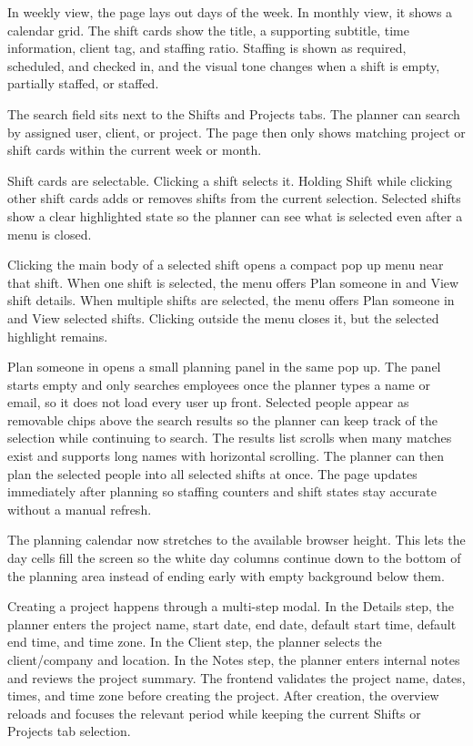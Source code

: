\documentclass[11pt]{article}
\begin{document}
In weekly view, the page lays out days of the week. In monthly view, it shows a calendar grid. The shift cards show the title, a supporting subtitle, time information, client tag, and staffing ratio. Staffing is shown as required, scheduled, and checked in, and the visual tone changes when a shift is empty, partially staffed, or staffed.

The search field sits next to the Shifts and Projects tabs. The planner can search by assigned user, client, or project. The page then only shows matching project or shift cards within the current week or month.

Shift cards are selectable. Clicking a shift selects it. Holding Shift while clicking other shift cards adds or removes shifts from the current selection. Selected shifts show a clear highlighted state so the planner can see what is selected even after a menu is closed.

Clicking the main body of a selected shift opens a compact pop up menu near that shift. When one shift is selected, the menu offers Plan someone in and View shift details. When multiple shifts are selected, the menu offers Plan someone in and View selected shifts. Clicking outside the menu closes it, but the selected highlight remains.

Plan someone in opens a small planning panel in the same pop up. The panel starts empty and only searches employees once the planner types a name or email, so it does not load every user up front. Selected people appear as removable chips above the search results so the planner can keep track of the selection while continuing to search. The results list scrolls when many matches exist and supports long names with horizontal scrolling. The planner can then plan the selected people into all selected shifts at once. The page updates immediately after planning so staffing counters and shift states stay accurate without a manual refresh.

The planning calendar now stretches to the available browser height. This lets the day cells fill the screen so the white day columns continue down to the bottom of the planning area instead of ending early with empty background below them.

Creating a project happens through a multi-step modal. In the Details step, the planner enters the project name, start date, end date, default start time, default end time, and time zone. In the Client step, the planner selects the client/company and location. In the Notes step, the planner enters internal notes and reviews the project summary. The frontend validates the project name, dates, times, and time zone before creating the project. After creation, the overview reloads and focuses the relevant period while keeping the current Shifts or Projects tab selection.
\end{document}
